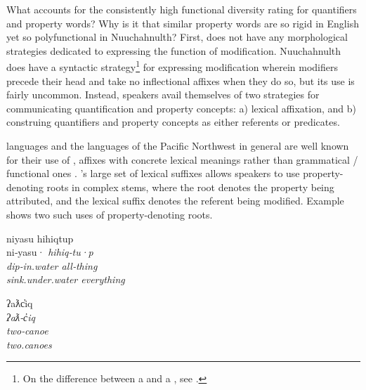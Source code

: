 What accounts for the consistently high functional diversity rating for quantifiers and property words? Why is it that similar property words are so rigid in English yet so polyfunctional in Nuuchahnulth? First,  does not have any morphological strategies dedicated to expressing the function of modification. Nuuchahnulth does have a syntactic strategy\footnote{On the difference between a  and a , see \textcites[537]{Croft2014}[380]{Croft2016}.} for expressing modification wherein modifiers precede their head and take no inflectional affixes when they do so, but its use is fairly uncommon. Instead, speakers avail themselves of two strategies for communicating quantification and property concepts: a) lexical affixation, and b) construing quantifiers and property concepts as either referents or predicates.

 languages and the languages of the Pacific Northwest in general are well known for their use of , affixes with concrete lexical meanings rather than grammatical / functional ones \parencite{Mithun1997}. 's large set of lexical suffixes allows speakers to use property-denoting roots in complex stems, where the root denotes the property being attributed, and the lexical suffix denotes the referent being modified. Example  shows two such uses of property-denoting roots.

\begin{exe}
  \ex\label{ex:4.5}
  \begin{xlist}

    \ex\label{ex:4.5a}
    \gllll niyasu           hihiqtup\\
           ni‑yasu·         \em{hihiq}‑tu·p\\
           dip‑in.water     \em{all}‑thing\\
           sink.under.water everything\\

    \ex\label{ex:4.5b}
    \gllll ʔaƛc̓iq\\
           \em{ʔaƛ}‑c̓iq\\
           \em{two}‑canoe\\
           two.canoes\\

  \end{xlist}
\end{exe}

